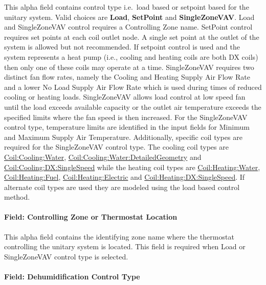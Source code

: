 This alpha field contains control type i.e.~load based or setpoint based for the unitary system. Valid choices are \textbf{Load}, \textbf{SetPoint} and \textbf{SingleZoneVAV}. Load and SingleZoneVAV control requires a Controlling Zone name. SetPoint control requires set points at each coil outlet node. A single set point at the outlet of the system is allowed but not recommended. If setpoint control is used and the system represents a heat pump (i.e., cooling and heating coils are both DX coils) then only one of these coils may operate at a time. SingleZoneVAV requires two distinct fan flow rates, namely the Cooling and Heating Supply Air Flow Rate and a lower No Load Supply Air Flow Rate which is used during times of reduced cooling or heating loads. SingleZoneVAV allows load control at low speed fan until the load exceeds available capacity or the outlet air temperature exceeds the specified limits where the fan speed is then increased. For the SingleZoneVAV control type, temperature limits are identified in the input fields for Minimum and Maximum Supply Air Temperature. Additionally, specific coil types are required for the SingleZoneVAV control type. The cooling coil types are \hyperref[coilcoolingwater]{Coil:Cooling:Water}, \hyperref[coilcoolingwaterdetailedgeometry]{Coil:Cooling:Water:DetailedGeometry} and \hyperref[coilcoolingdxsinglespeed]{Coil:Cooling:DX:SingleSpeed} while the heating coil types are \hyperref[coilheatingwater]{Coil:Heating:Water}, \hyperref[coilheatinggas-000]{Coil:Heating:Fuel}, \hyperref[coilheatingelectric]{Coil:Heating:Electric} and \hyperref[coilheatingdxsinglespeed]{Coil:Heating:DX:SingleSpeed}. If alternate coil types are used they are modeled using the load based control method.

\paragraph{Field: Controlling Zone or Thermostat Location}\label{field-controlling-zone-or-thermostat-location}

This alpha field contains the identifying zone name where the thermostat controlling the unitary system is located. This field is required when Load or SingleZoneVAV control type is selected.

\paragraph{Field: Dehumidification Control Type}\label{field-dehumidification-control-type-001}

